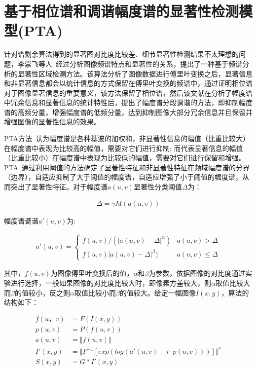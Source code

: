 
\section{基于相位谱和调谐幅度谱的显著性检测模型(PTA)}
\label{3_4}

针对谱剩余算法得到的显著图对比度比较差、细节显著性检测结果不太理想的问题，李崇飞等人~\cite{李崇飞2012相位谱}经过分析图像频谱特点和显著性的关系，提出了一种基于频谱分析的显著性区域检测方法。该算法分析了图像数据进行傅里叶变换之后，显著信息和非显著信息都会以统计信息的方式保留在傅里叶变换的频谱中，通过证明相位谱对于图像显著信息的重要意义，该方法保留了相位谱，然后该文献在分析了幅度谱中冗余信息和显著信息的统计特性后，提出了幅度谱分段调谐的方法，即抑制幅度谱的高频分量，增强幅度谱的低频分量，达到抑制图像大部分冗余信息并且保留并增强图像的显著性信息的效果。

PTA方法~\cite{李崇飞2012相位谱}认为幅度谱是各种基波的加权和，非显著性信息的幅值（比重比较大）在幅度谱中表现为比较高的幅值，需要对它们进行抑制; 而代表显著信息的幅值（比重比较小）在幅度谱中表现为比较低的幅值，需要对它们进行保留和增强。PTA~\cite{李崇飞2012相位谱}通过利用阈值的方法确定了显著性特征和非显著性特征在频域幅度谱的分界（边界），自适应抑制了大于阈值的幅度谱，自适应增强了小于阈值的幅度谱，从而突出了显著性特征。对于幅度谱$a(u,v)$显著性分类阈值$\Delta$为：
\begin{linenomath}
\begin{align}
\Delta=\gamma M(a(u,v))
\label{式3_20}
\end{align}
\end{linenomath}
幅度谱调谐$a'(u,v)$为:
\begin{linenomath}
\begin{align}
a'(u,v) = \left\{ \begin{array}{ll}
f(u,v)/(|a(u,v)-\Delta|^{\alpha}) & a(u,v)>\Delta\\
f(u,v)|a(u,v)-\Delta|^{\beta}) & a(u,v)\leq \Delta
\end{array} \right.
\label{式3_21}
\end{align}
\end{linenomath}
其中，$f(u,v)$为图像傅里叶变换后的值，$\alpha$和$\beta$为参数，依据图像的对比度通过实验进行选择，一般如果图像的对比度比较大时，即像素方差较大，则$\alpha$取值比较大而$\beta$的值较小，反之则$\alpha$取值比较小而$\beta$的值较大。给定一幅图像$I(x,y)$，算法的结构如下：
\begin{linenomath}
\begin{align}
f(u，v) &= F(I(x,y))\label{式3_22}\\
p(u,v) &= P(f(u,v))\label{式3_23}\\
a(u,v) &= \Vert f(u,v)\Vert \label{24}\\
I'(x,y) &= \Vert F^{-1}[exp(log(a'(u,v)+i\cdot p(u,v)))]\Vert^{2}\label{式3_25}\\
S(x,y) &= G\ast I'(x,y)\label{式3_26}
\end{align}
\end{linenomath}

